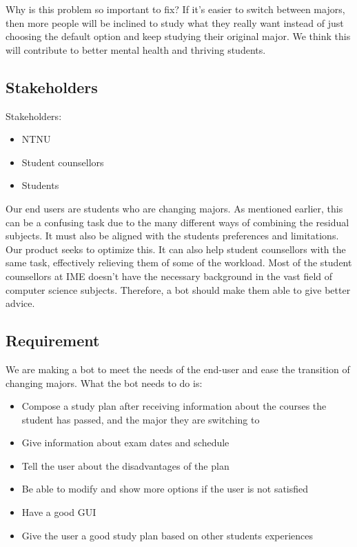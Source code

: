 \documentclass[pdftex, 12pt, norsk, a4paper, twoside]{article}
\numberwithin{equation}{section}
\numberwithin{figure}{section}
\numberwithin{table}{section}
\begin{document}
Why is this problem so important to fix?
If it’s easier to switch between majors, then more people will be inclined to study what they really want instead of just choosing the default option and keep studying their original major. We think this will contribute to better mental health and thriving students. 

\newpage
\hfill
\hfill

\subsection{Stakeholders}

Stakeholders:
\begin{itemize}
    \item NTNU
    \item Student counsellors
    \item Students
\end{itemize}
Our end users are students who are changing majors. As mentioned earlier, this can be a confusing task due to the many different ways of combining the residual subjects. It must also be aligned with the students preferences and limitations. Our product seeks to optimize this. It can also help student counsellors with the same task, effectively relieving them of some of the workload. Most of the student counsellors at IME doesn't have the necessary background in the vast field of computer science subjects. Therefore, a bot should make them able to give better advice.

\subsection{Requirement}
We are making a bot to meet the needs of the end-user and ease the transition of changing majors. What the bot needs to do is:
\begin{itemize}
    \item Compose a study plan after receiving information about the courses the student has passed, and the major they are switching to
    \item Give information about exam dates and schedule
    \item Tell the user about the disadvantages of the plan
    \item Be able to modify and show more options if the user is not satisfied
    \item Have a good GUI
    \item Give the user a good study plan based on other students experiences
\end{itemize}
\end{document}
